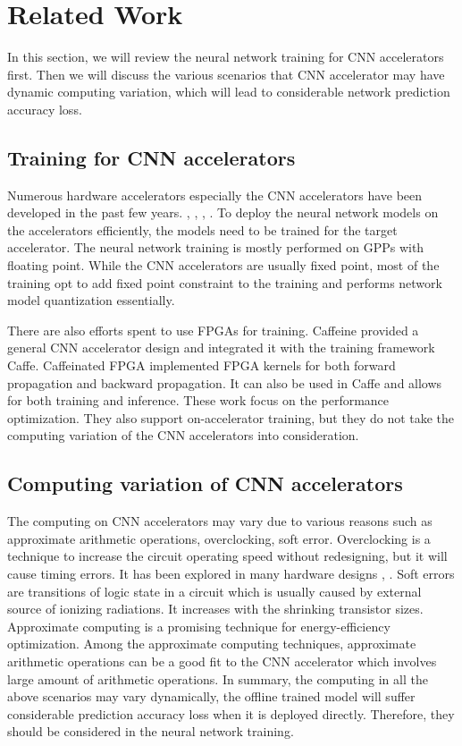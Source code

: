 \section{Related Work} \label{sec:relatedwork}
In this section, we will review the neural network training for CNN accelerators first.
Then we will discuss the various scenarios that CNN accelerator 
may have dynamic computing variation, which will lead to 
considerable network prediction accuracy loss. 

\subsection{Training for CNN accelerators} 
Numerous hardware accelerators especially the CNN accelerators have
been developed in the past few years. \cite{Cnvlutin_25} 
\cite{deepburing_12}, \cite{Aydonat_27}, 
\cite{Caffeine_6}, \cite{Wei_29}. To 
deploy the neural network models on the accelerators efficiently, 
the models need to be trained for the target accelerator. 
The neural network training is mostly performed on GPPs with floating point.
While the CNN accelerators are usually fixed point, most of the training opt 
to add fixed point constraint to the training and performs network model 
quantization essentially\cite{Matthieu2014_8, Hwang2014_17}. 

There are also efforts spent to use FPGAs for training. 
Caffeine\cite{Caffeine_6} provided a general CNN accelerator design and integrated it with 
the training framework Caffe. Caffeinated FPGA\cite{DiCecco_4} implemented FPGA kernels 
for both forward propagation and backward propagation. It can also be used in Caffe and allows for 
both training and inference. These work focus on the performance optimization. 
They also support on-accelerator training, but they do not take the computing 
variation of the CNN accelerators into consideration.

\subsection{Computing variation of CNN accelerators} 
The computing on CNN accelerators may vary due to various reasons 
such as approximate arithmetic operations, overclocking, soft error.
Overclocking is a technique to increase the circuit operating speed 
without redesigning, but it will cause timing errors. It has been 
explored in many hardware designs \cite{overclock_3}, \cite{Razor}. 
Soft errors are transitions of logic state in a circuit 
which is usually caused by external source of ionizing radiations. 
It increases with the shrinking transistor sizes. 
Approximate computing is a promising technique for 
energy-efficiency optimization\cite{Miao_40,han_41}.
Among the approximate computing techniques, approximate 
arithmetic operations \cite{appro_45,approxANN_44} can be a good fit to the CNN accelerator 
which involves large amount of arithmetic operations. 
In summary, the computing in all the above scenarios may vary dynamically, 
the offline trained model will suffer considerable prediction 
accuracy loss when it is deployed directly. Therefore, they should be considered in the 
neural network training. 

